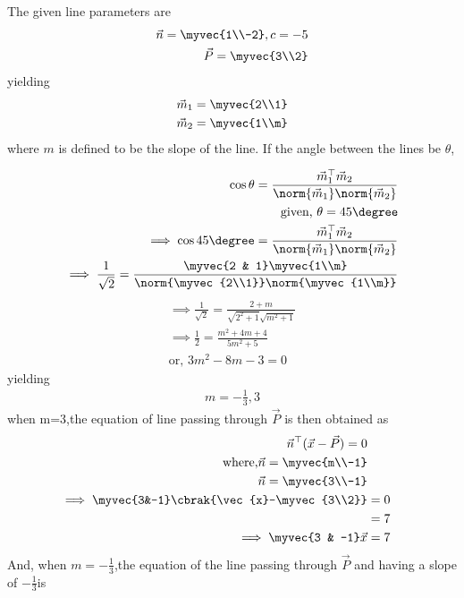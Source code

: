 The given line parameters are
\begin{align}
   \vec{n}=\myvec{1\\-2},c=-5\\
	\vec{P}=\myvec{3\\2}
\end{align}
yielding
\begin{align}
\vec{m}_1=\myvec{2\\1}\\
\vec{m}_2=\myvec{1\\m}
\end{align}
where  $m$ is defined to be the slope of the line. If the angle between the lines be $\theta$,

\begin{align}
\cos \theta = \frac{\vec{m}_1^\top \vec{m}_2}{\norm{\vec{m}_1}\norm{\vec{m}_2}}\\
	\text{given, } \theta = 45\degree\\
\implies \cos45\degree =  \frac{\vec{m}_1^\top \vec{m}_2}{\norm{\vec{m}_1}\norm{\vec{m}_2}}\\
\implies \frac{1}{\sqrt{2}} = \frac{\myvec{2 & 1} \myvec{1\\m}}{\norm{\myvec{2\\1}}\norm{\myvec{1\\m}}}
\end{align}
\begin{align}
\implies \frac{1}{\sqrt{2}}=\frac{2+m}{\sqrt{2^2 + 1}\sqrt{m^2 + 1}}\\
\implies \frac{1}{2}=\frac{m^2 + 4m +4}{5m^2 +5}\\
\text{or, } 3m^2 - 8m -3 = 0
\end{align}
yielding
\begin{align}
m= - \frac{1}{3}, 3
\end{align} 
when m=3,the equation of line passing through $\vec{P}$  is then obtained as
\begin{align}
\vec{n}^{\top} ({\vec{x}-\vec{P}}) = 0\\
\text{where,}{\vec{n}}=\myvec{m\\-1} \\
{\vec{n}}=\myvec{3\\-1} \\
\implies 
	\myvec{3&-1}\cbrak{\vec{x}-\myvec{3\\2}}&=0\\
	&=7 \\
 \implies 	\myvec{3 & -1}\vec{x} &= 7
\end{align}
And, when $m=-\frac{1}{3}$,the equation of the line passing through $\vec{P}$  and having a slope of $-\frac{1}{3}$is
